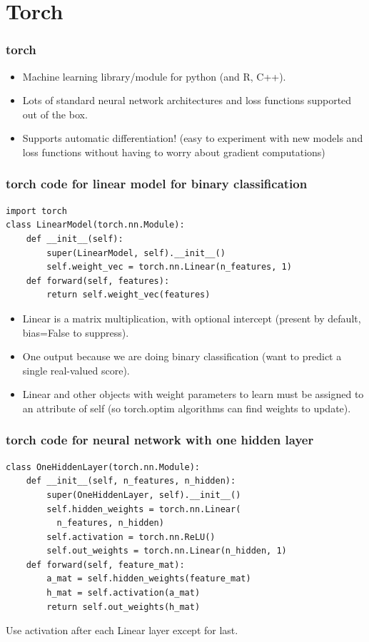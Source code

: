 \documentclass{beamer}
\begin{document}
\section{Torch}

\begin{frame}
  \frametitle{torch}
  \begin{itemize}
  \item Machine learning library/module for python (and R, C++).
  \item Lots of standard neural network architectures and loss
    functions supported out of the box.
  \item Supports automatic differentiation! (easy to experiment with
    new models and loss functions without having to worry about
    gradient computations)
  \end{itemize}
\end{frame}

\begin{frame}[fragile]
  \frametitle{torch code for linear model for binary classification}
\begin{verbatim}
import torch
class LinearModel(torch.nn.Module):
    def __init__(self):
        super(LinearModel, self).__init__()
        self.weight_vec = torch.nn.Linear(n_features, 1)
    def forward(self, features):
        return self.weight_vec(features)
\end{verbatim}

  \begin{itemize}
  \item Linear is a matrix multiplication, with optional intercept
    (present by default, bias=False to suppress).
  \item One output because we are doing binary classification (want to
    predict a single real-valued score).
  \item Linear and other objects with weight parameters to learn must
    be assigned to an attribute of self (so torch.optim algorithms can
    find weights to update).
  \end{itemize}
\end{frame}

\begin{frame}[fragile]
  \frametitle{torch code for neural network with one hidden layer}
\begin{verbatim}
class OneHiddenLayer(torch.nn.Module):
    def __init__(self, n_features, n_hidden):
        super(OneHiddenLayer, self).__init__()
        self.hidden_weights = torch.nn.Linear(
          n_features, n_hidden)
        self.activation = torch.nn.ReLU()
        self.out_weights = torch.nn.Linear(n_hidden, 1)
    def forward(self, feature_mat):
        a_mat = self.hidden_weights(feature_mat)
        h_mat = self.activation(a_mat)
        return self.out_weights(h_mat)
\end{verbatim}

Use activation after each Linear layer except for last.
\end{frame}
\end{document}
